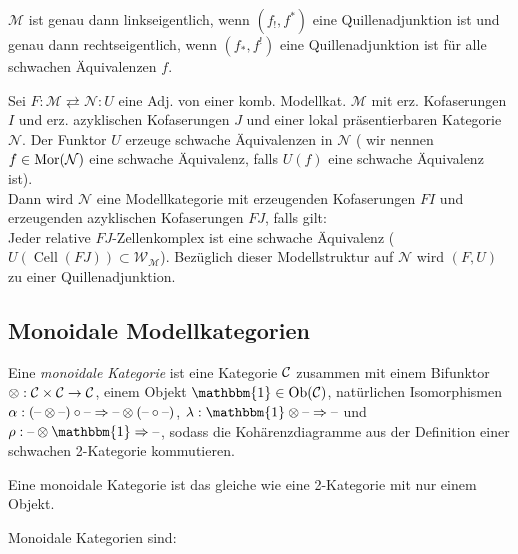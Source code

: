 \documentclass{cheat-sheet}
\newcommand{\Weak}{\mathcal{W}} %
\newcommand{\ModC}{\mathcal{M}} %
\newcommand{\NodC}{\mathcal{N}} %
\DeclareMathOperator{\Cell}{Cell} %
\newcommand{\LonelyHeart}{\{ \, \heartsuit \, \}} %
\newcommand{\UnitOb}{\mathbbm{1}} %
\begin{document}
\begin{prop}
  $\ModC$ ist genau dann linkseigentlich, wenn $(f_{!}, f^*)$ eine Quillenadjunktion ist und genau dann rechtseigentlich, wenn $(f_*, f^{!})$ eine Quillenadjunktion ist für alle schwachen Äquivalenzen $f$.
\end{prop}


\begin{satz}
  Sei $F : \ModC \rightleftarrows \NodC : U$ eine Adj. von einer komb. Modellkat. $\ModC$ mit erz. Kofaserungen $I$ und erz. azyklischen Kofaserungen $J$ und einer lokal präsentierbaren Kategorie $\NodC$.
  Der Funktor $U$ erzeuge schwache Äquivalenzen in $\NodC$ (\dh{} wir nennen $f \in \Mor(\NodC)$ eine schwache Äquivalenz, falls $U(f)$ eine schwache Äquivalenz ist). \\
  Dann wird $\NodC$ eine Modellkategorie mit erzeugenden Kofaserungen $FI$ und erzeugenden azyklischen Kofaserungen $FJ$, falls gilt: \\
  Jeder relative $FJ$-Zellenkomplex ist eine schwache Äquivalenz (\dh{} $U(\Cell(FJ)) \subset \Weak_\ModC$).
  Bezüglich dieser Modellstruktur auf $\NodC$ wird $(F, U)$ zu einer Quillenadjunktion.
\end{satz}

\subsection{Monoidale Modellkategorien}

\begin{defn}
  Eine \emph{monoidale Kategorie} ist eine Kategorie $\mathcal{C}$ zusammen mit einem Bifunktor $\otimes : \mathcal{C} \times \mathcal{C} \to \mathcal{C}$, einem Objekt $\UnitOb \in \Ob(\Cat)$, natürlichen Isomorphismen $\alpha : (\text{--} \otimes \text{--}) \circ \text{--} \Rightarrow \text{--} \otimes (\text{--} \circ \text{--})$, $\lambda : \UnitOb \otimes \blank \Rightarrow \blank$ und $\rho : \blank \otimes \UnitOb \Rightarrow \blank$, sodass die Kohärenzdiagramme aus der Definition einer schwachen 2-Kategorie kommutieren.
\end{defn}

\begin{bem}
  Eine monoidale Kategorie ist das gleiche wie eine 2-Kategorie mit nur einem Objekt.
\end{bem}

\begin{bspe}
  Monoidale Kategorien sind: \quad
  \inlineitem{$(\SetC, \times, \LonelyHeart)$} \\
\end{bspe}
\end{document}
